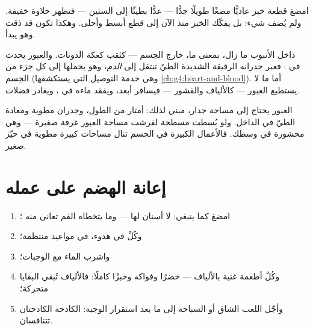 \begin{example}\label{ex:g4:journey-of-food:sweet}
امضغ قطعة خبز عاديًّا مضغًا طويلًا جدًّا --- عدًّا بطيئًا إلى الستين
--- فتظهر حلاوة خفيفة. ولم يُضف شيء: بل  يفكّك الخبز منذ
الآن إلى قطع أبسط وأحلى. وهكذا تكون قد ذقت  وهو يبدأ.
\end{example}

\begin{proposition}\label{prop:g4:journey-of-food:absorb}
داخل الأنبوب ما زال، بمعنى ما، خارج الجسم --- كثقب كعكة الدونات.
والعبور يحدث في \emph{}: فعبر جدرانه الرقيقة الشديدة
الطيّ تنتقل  إلى \emph{الدم}، وهو يحملها إلى كل
جزء من الجسم (وهي خدمة التوصيل التي يستكشفها
\cref{ch:g4:heart-and-blood}). أما ما لا يستطيع العبور --- كالألياف
والقشور --- فيسافر أبعد، ويفقد ماءه في ، ويغادر
فضلات.
\end{proposition}
\admitted

\begin{remark}\label{rem:g4:journey-of-food:surface}
العبور يحتاج إلى مساحة جدار،  مبني لذلك: أمتار من
الطول، وجدران مطوية ومعادة الطيّ في الداخل. ولو بُسطت مسطحة لفرشت
مساحة العبور غرفة صغيرة --- وهي محشورة في وسطك. فالأعمال الكبيرة
في الجسم تنال مساحات كبيرة مطوية في حيّز صغير.
\end{remark}

\section{إعانة الهضم على عمله}

\begin{method}\label{met:g4:journey-of-food:habits}
\begin{enumerate}
  \item امضغ كما ينبغي:  لا أسنان لها --- وما يتخطاه الفم
        تعاني منه ؛
  \item وكُلْ في هدوء، في مواعيد منتظمة؛
  \item واشرب الماء مع الوجبات؛
  \item وكُلْ أطعمة غنية بالألياف --- خضرًا وفواكه وخبزًا كاملًا:
        فالألياف تُبقي البقايا متحركة؛
  \item وأجّل اللعب الشاق أو السباحة إلى ما بعد استقرار الوجبة:
         الكادحة  الكادحتان تتنافسان.
\end{enumerate}
\end{method}

